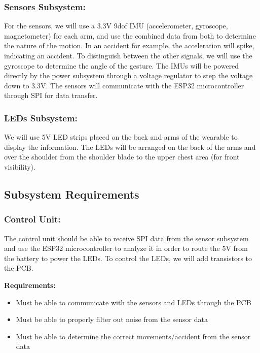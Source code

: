 \documentclass[12pt]{article}
\begin{document}
    \subsubsection{Sensors Subsystem:} 
    For the sensors, we will use a 3.3V 9dof IMU (accelerometer, 
    gyroscope, magnetometer) \cite{STMicroelectronics2015LSM9DS1} for each arm, and use the combined 
    data from both to determine the nature of the motion. In an 
    accident for example, the acceleration will spike, indicating 
    an accident. To distinguish between the other signals, we will
     use the gyroscope to determine the angle of the gesture. The 
     IMUs will be powered directly by the power subsystem through 
     a voltage regulator to step the voltage down to 3.3V. The 
     sensors will communicate with the ESP32 microcontroller 
     through SPI for data transfer. 
    \subsubsection{LEDs Subsystem:} 
    We will use 5V LED strips placed on the back and arms of the 
    wearable to display the information. The LEDs will be arranged 
    on the back of the arms and over the shoulder from the 
    shoulder blade to the upper chest area (for front visibility). 


\subsection{Subsystem Requirements}

\subsubsection{Control Unit:} 
The control unit should be able to receive SPI data from the 
sensor subsystem and use the ESP32 microcontroller to analyze 
it in order to route the 5V from the battery to power the LEDs. 
To control the LEDs, we will add transistors \cite{MicrochipVN10K} to the PCB. 

\textbf{Requirements:} 
\begin{itemize}
    \item Must be able to communicate with the sensors and LEDs through the PCB
    \item Must be able to properly filter out noise from the sensor data
    \item Must be able to determine the correct movements/accident from the sensor data
\end{itemize}
\end{document}
